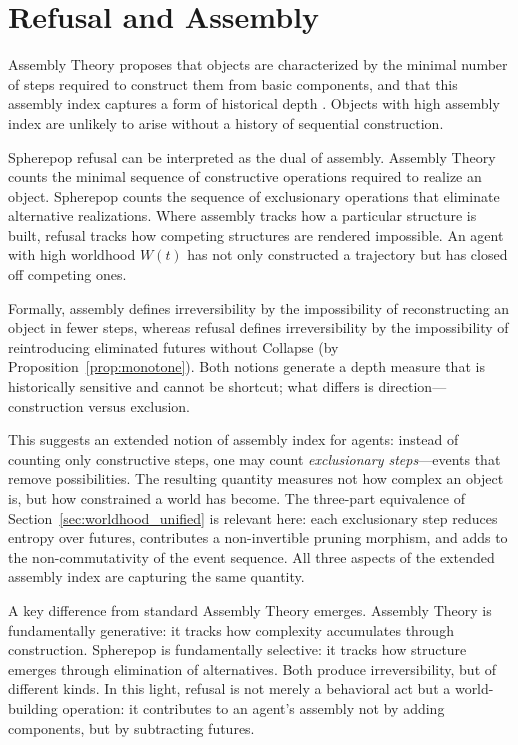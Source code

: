 \documentclass[11pt]{article}
\begin{document}
\section{Refusal and Assembly}
\label{sec:assembly}

Assembly Theory proposes that objects are characterized by the minimal number of
steps required to construct them from basic components, and that this assembly
index captures a form of historical depth \cite{cronin2021assembly,cronin2023assembly}. Objects
with high assembly index are unlikely to arise without a history of sequential
construction.

Spherepop refusal can be interpreted as the dual of assembly. Assembly Theory
counts the minimal sequence of constructive operations required to realize an
object. Spherepop counts the sequence of exclusionary operations that eliminate
alternative realizations. Where assembly tracks how a particular structure is
built, refusal tracks how competing structures are rendered impossible. An
agent with high worldhood $W(t)$ has not only constructed a trajectory but has
closed off competing ones.

Formally, assembly defines irreversibility by the impossibility of reconstructing
an object in fewer steps, whereas refusal defines irreversibility by the
impossibility of reintroducing eliminated futures without Collapse (by
Proposition~\ref{prop:monotone}). Both notions generate a depth measure that is
historically sensitive and cannot be shortcut; what differs is
direction---construction versus exclusion.

This suggests an extended notion of assembly index for agents: instead of
counting only constructive steps, one may count \emph{exclusionary steps}---events
that remove possibilities. The resulting quantity measures not how complex an
object is, but how constrained a world has become. The three-part equivalence of
Section~\ref{sec:worldhood_unified} is relevant here: each exclusionary step
reduces entropy over futures, contributes a non-invertible pruning morphism, and
adds to the non-commutativity of the event sequence. All three aspects of the
extended assembly index are capturing the same quantity.

A key difference from standard Assembly Theory emerges. Assembly Theory is
fundamentally generative: it tracks how complexity accumulates through
construction. Spherepop is fundamentally selective: it tracks how structure
emerges through elimination of alternatives. Both produce irreversibility, but
of different kinds. In this light, refusal is not merely a behavioral act but
a world-building operation: it contributes to an agent's assembly not by adding
components, but by subtracting futures.
\end{document}
